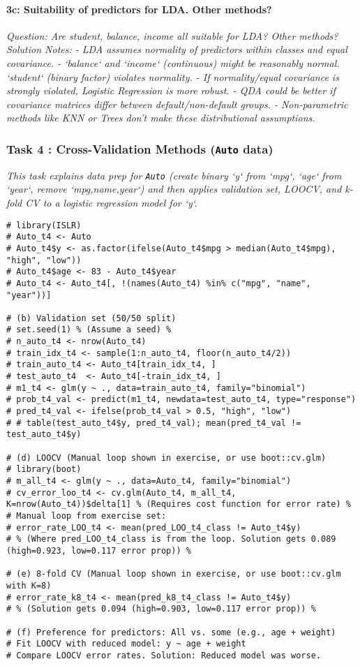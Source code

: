 \documentclass[12pt,a4paper]{article}
\newcommand{\Robject}[1]{\texttt{#1}} %
\begin{document}
            \paragraph{3c: Suitability of predictors for LDA. Other methods?}
            \textit{Question: Are student, balance, income all suitable for LDA? Other methods?}
            \textit{Solution Notes:
            - LDA assumes normality of predictors within classes and equal covariance.
            - `balance` and `income` (continuous) might be reasonably normal. `student` (binary factor) violates normality.
            - If normality/equal covariance is strongly violated, Logistic Regression is more robust.
            - QDA could be better if covariance matrices differ between default/non-default groups.
            - Non-parametric methods like KNN or Trees don't make these distributional assumptions.
            }

        \subsubsection{Task 4 : Cross-Validation Methods (\Robject{Auto} data)}
            \textit{This task explains data prep for \Robject{Auto} (create binary `y` from `mpg`, `age` from `year`, remove `mpg,name,year`) and then applies validation set, LOOCV, and k-fold CV to a logistic regression model for `y`.}
\begin{lstlisting}[caption={CV Methods Example (Ex Set 2, T4)}]
# library(ISLR)
# Auto_t4 <- Auto
# Auto_t4$y <- as.factor(ifelse(Auto_t4$mpg > median(Auto_t4$mpg), "high", "low"))
# Auto_t4$age <- 83 - Auto_t4$year
# Auto_t4 <- Auto_t4[, !(names(Auto_t4) %in% c("mpg", "name", "year"))]

# (b) Validation set (50/50 split)
# set.seed(1) % (Assume a seed) %
# n_auto_t4 <- nrow(Auto_t4)
# train_idx_t4 <- sample(1:n_auto_t4, floor(n_auto_t4/2))
# train_auto_t4 <- Auto_t4[train_idx_t4, ]
# test_auto_t4  <- Auto_t4[-train_idx_t4, ]
# m1_t4 <- glm(y ~ ., data=train_auto_t4, family="binomial")
# prob_t4_val <- predict(m1_t4, newdata=test_auto_t4, type="response")
# pred_t4_val <- ifelse(prob_t4_val > 0.5, "high", "low")
# # table(test_auto_t4$y, pred_t4_val); mean(pred_t4_val != test_auto_t4$y)

# (d) LOOCV (Manual loop shown in exercise, or use boot::cv.glm)
# library(boot)
# m_all_t4 <- glm(y ~ ., data=Auto_t4, family="binomial")
# cv_error_loo_t4 <- cv.glm(Auto_t4, m_all_t4, K=nrow(Auto_t4))$delta[1] % (Requires cost function for error rate) %
# Manual loop from exercise set:
# error_rate_LOO_t4 <- mean(pred_LOO_t4_class != Auto_t4$y) 
# % (Where pred_LOO_t4_class is from the loop. Solution gets 0.089 (high=0.923, low=0.117 error prop)) %

# (e) 8-fold CV (Manual loop shown in exercise, or use boot::cv.glm with K=8)
# error_rate_k8_t4 <- mean(pred_k8_t4_class != Auto_t4$y)
# % (Solution gets 0.094 (high=0.903, low=0.117 error prop)) %

# (f) Preference for predictors: All vs. some (e.g., age + weight)
# Fit LOOCV with reduced model: y ~ age + weight
# Compare LOOCV error rates. Solution: Reduced model was worse.
\end{lstlisting}
\end{document}
